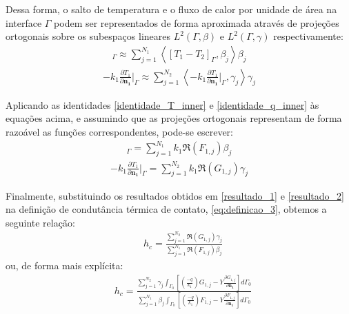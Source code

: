 Dessa forma, o salto de temperatura e o fluxo de calor por unidade de área na interface $\Gamma$ podem ser representados de forma aproximada através de projeções
ortogonais sobre os subespaços lineares $L^2(\Gamma, \beta)$ e $L^2(\Gamma, \gamma)$ respectivamente:
\begin{align}
[T_1 - T_2]_\Gamma \approx \sum_{j=1}^{N_1} \left\langle  \left[T_1 - T_2\right]_\Gamma, \beta_j \right\rangle \beta_j
\end{align}
\begin{align}
	- k_1 \frac{\partial T_1}{\partial\mathbf{n_1}}\bigg|_\Gamma \approx \sum_{j=1}^{N_2} \left\langle  -k_1 \frac{\partial T_1}{\partial\mathbf{n_1}}\bigg|_\Gamma, \gamma_j \right\rangle \gamma_j
\end{align}

Aplicando as identidades \eqref{identidade_T_inner} e \eqref{identidade_q_inner} às equações acima, e assumindo que as projeções ortogonais representam
de forma razoável as funções correspondentes, pode-se escrever:
\begin{align}
	[T_1 - T_2]_\Gamma = \sum_{j=1}^{N_1} k_1 \Re(F_{1,j}) \beta_j \label{resultado_1}
\end{align}
\begin{align}
	- k_1 \frac{\partial T_1}{\partial\mathbf{n_1}}\bigg|_\Gamma = \sum_{j=1}^{N_2} k_1 \Re(G_{1,j}) \gamma_j \label{resultado_2}
\end{align}

Finalmente, substituindo os resultados obtidos em \eqref{resultado_1} e \eqref{resultado_2} na definição de condutância térmica de contato,
\eqref{eq:definicao_3}, obtemos a seguinte relação:
\begin{align}
	& h_c %
	= \frac{\displaystyle\sum_{j=1}^{N_2} \Re(G_{1,j}) \gamma_j}{\displaystyle\sum_{j=1}^{N_1} \Re(F_{1,j}) \beta_j}
	\label{equacao_definicao_f_r}
\end{align}
ou, de forma mais explícita:
\begin{align}
	& h_c %
	= \frac{\displaystyle\sum_{j=1}^{N_2} \gamma_j\int_{\Gamma_0}\left[\left(\frac{-q}{k_1}\right)G_{1,j} - Y\frac{\partial G_{1,j}}{\partial\mathbf{n_1}}\right]d\Gamma_0}{\displaystyle\sum_{j=1}^{N_1} \beta_j \int_{\Gamma_0}\left[\left(\frac{-q}{k_1}\right)F_{1,j} - Y\frac{\partial F_{1,j}}{\partial\mathbf{n_1}}\right]d\Gamma_0}
	\label{equacao_definicao_f_r_expl}
\end{align}

